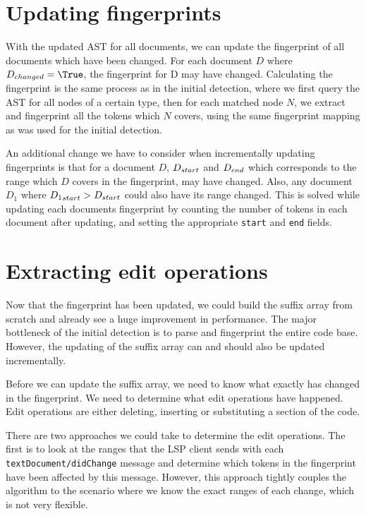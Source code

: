 \section{Updating fingerprints}

With the updated AST for all documents, we can update the fingerprint of all documents
which have been changed. For each document $D$ where $\Access{D}{changed} = \True$, the
fingerprint for D may have changed. Calculating the fingerprint is the same process as in
the initial detection, where we first query the AST for all nodes of a certain type, then
for each matched node $N$, we extract and fingerprint all the tokens which $N$ covers,
using the same fingerprint mapping as was used for the initial detection.

An additional change we have to consider when incrementally updating fingerprints is that
for a document $D$, ${{D}_{start}}$ and ${{D}_{end}}$ which corresponds to the
range which $D$ covers in the fingerprint, may have changed. Also, any document $D_1$
where ${{D_1}_{start}} > {{D}_{start}}$ could also have its range changed. This is
solved while updating each documents fingerprint by counting the number of tokens in each
document after updating, and setting the appropriate \verb|start| and \verb|end| fields.



\section{Extracting edit operations}

Now that the fingerprint has been updated, we could build the suffix array from scratch
and already see a huge improvement in performance. The major bottleneck of the initial
detection is to parse and fingerprint the entire code base. However, the updating of the
suffix array can and should also be updated incrementally.

Before we can update the suffix array, we need to know what exactly has changed in the
fingerprint. We need to determine what edit operations have happened. Edit operations are
either deleting, inserting or substituting a section of the code.

There are two approaches we could take to determine the edit operations. The first is to
look at the ranges that the LSP client sends with each \verb|textDocument/didChange|
message and determine which tokens in the fingerprint have been affected by this message.
However, this approach tightly couples the algorithm to the scenario where we know the exact
ranges of each change, which is not very flexible.

